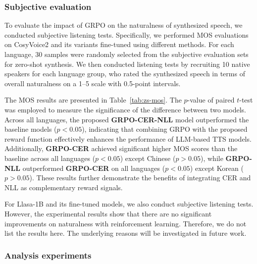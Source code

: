 \documentclass{article}
\begin{document}
\subsubsection{Subjective evaluation}
\vspace{-0.2cm}

To evaluate the impact of GRPO on the naturalness of synthesized speech, we conducted subjective listening tests. Specifically, we performed MOS evaluations on CosyVoice2 and its variants fine-tuned using different methods. For each language, 30 samples were randomly selected from the subjective evaluation sets for zero-shot synthesis. We then conducted listening tests by recruiting 10 native speakers for each language group, who rated the synthesized speech in terms of overall naturalness on a 1–5 scale with 0.5-point intervals.

The MOS results are presented in Table~\ref{tab:zs-mos}. The $p$-value of paired $t$-test was employed to measure the significance of the difference between two models. Across all languages, the proposed \textbf{GRPO-CER-NLL} model outperformed the baseline models ($p<0.05$), indicating that combining GRPO with the proposed reward function effectively enhances the performance of LLM-based TTS models. Additionally, \textbf{GRPO-CER} achieved significant higher MOS scores than the baseline across all languages ($p<0.05$) except Chinese ($p>0.05$), while \textbf{GRPO-NLL} outperformed \textbf{GRPO-CER} on all languages ($p<0.05$) except Korean ($p>0.05$). These results further demonstrate the benefits of integrating CER and NLL as complementary reward signals.

For Llasa-1B and its fine-tuned models, we also conduct subjective listening tests. However, the experimental results show that there are no significant improvements on naturalness with reinforcement learning. Therefore, we do not list the results here. The underlying reasons will be investigated in future work.

\vspace{-0.4cm}
\subsubsection{Analysis experiments}
\vspace{-0.2cm}
\end{document}
